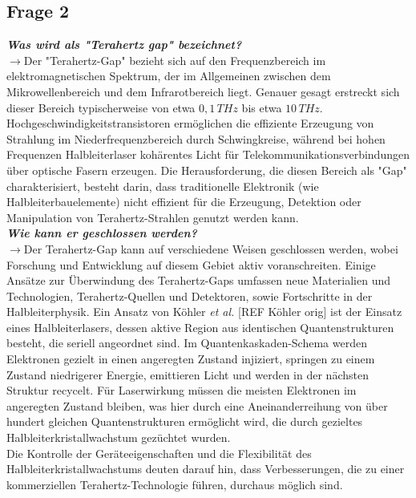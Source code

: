 \subsection{\label{subsec:FZV2}Frage 2}
\textbf{\textit{Was wird als "Terahertz gap" bezeichnet?}}\\
$\rightarrow$Der "Terahertz-Gap" bezieht sich auf den Frequenzbereich im elektromagnetischen Spektrum, 
der im Allgemeinen zwischen dem Mikrowellenbereich und dem Infrarotbereich liegt. 
Genauer gesagt erstreckt sich dieser Bereich typischerweise von 
etwa $0,1\,\si{THz}$ bis etwa $10\,\si{THz}$.
Hochgeschwindigkeitstransistoren ermöglichen die effiziente Erzeugung von Strahlung im 
Niederfrequenzbereich durch Schwingkreise, während bei hohen Frequenzen Halbleiterlaser 
kohärentes Licht für Telekommunikationsverbindungen über optische Fasern erzeugen.
Die Herausforderung, die diesen Bereich als "Gap" charakterisiert, besteht darin, 
dass traditionelle Elektronik (wie Halbleiterbauelemente) nicht effizient für die Erzeugung, 
Detektion oder Manipulation von Terahertz-Strahlen genutzt werden kann. \\ 

\textbf{\textit{Wie kann er geschlossen werden?}}\\
$\rightarrow$Der Terahertz-Gap kann auf verschiedene Weisen geschlossen werden, 
wobei Forschung und Entwicklung auf diesem Gebiet aktiv voranschreiten. 
Einige Ansätze zur Überwindung des Terahertz-Gaps umfassen neue Materialien und Technologien,
Terahertz-Quellen und Detektoren, sowie Fortschritte in der Halbleiterphysik. 
Ein Ansatz von Köhler \textit{et al.} [REF Köhler orig] ist der Einsatz eines Halbleiterlasers,
dessen aktive Region aus identischen Quantenstrukturen besteht, die seriell angeordnet sind. 
Im Quantenkaskaden-Schema werden Elektronen gezielt in einen angeregten Zustand injiziert, 
springen zu einem Zustand niedrigerer Energie, emittieren Licht und werden in der 
nächsten Struktur recycelt. Für Laserwirkung müssen die meisten Elektronen im angeregten Zustand bleiben, 
was hier durch eine Aneinanderreihung von über hundert gleichen Quantenstrukturen ermöglicht wird, 
die durch gezieltes Halbleiterkristallwachstum gezüchtet wurden. \\
Die Kontrolle der Geräteeigenschaften und die Flexibilität des Halbleiterkristallwachstums 
deuten darauf hin, dass Verbesserungen, die zu einer kommerziellen Terahertz-Technologie führen, 
durchaus möglich sind. \\

